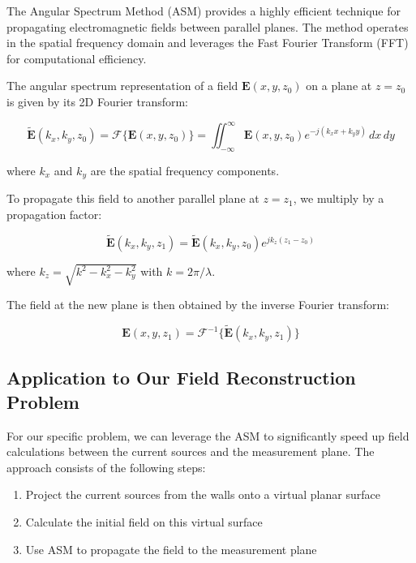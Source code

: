 \documentclass[12pt,a4paper]{article}
\begin{document}
The Angular Spectrum Method (ASM) provides a highly efficient technique for propagating electromagnetic fields between parallel planes. The method operates in the spatial frequency domain and leverages the Fast Fourier Transform (FFT) for computational efficiency.

The angular spectrum representation of a field $\mathbf{E}(x,y,z_0)$ on a plane at $z = z_0$ is given by its 2D Fourier transform:

\begin{equation}
    \tilde{\mathbf{E}}(k_x, k_y, z_0) = \mathcal{F}\{\mathbf{E}(x,y,z_0)\} = \iint_{-\infty}^{\infty} \mathbf{E}(x,y,z_0) e^{-j(k_x x + k_y y)} \, dx \, dy
\end{equation}

where $k_x$ and $k_y$ are the spatial frequency components.

To propagate this field to another parallel plane at $z = z_1$, we multiply by a propagation factor:

\begin{equation}
    \tilde{\mathbf{E}}(k_x, k_y, z_1) = \tilde{\mathbf{E}}(k_x, k_y, z_0) e^{jk_z(z_1-z_0)}
\end{equation}

where $k_z = \sqrt{k^2 - k_x^2 - k_y^2}$ with $k = 2\pi/\lambda$.

The field at the new plane is then obtained by the inverse Fourier transform:

\begin{equation}
    \mathbf{E}(x,y,z_1) = \mathcal{F}^{-1}\{\tilde{\mathbf{E}}(k_x, k_y, z_1)\}
\end{equation}

\subsection{Application to Our Field Reconstruction Problem}

For our specific problem, we can leverage the ASM to significantly speed up field calculations between the current sources and the measurement plane. The approach consists of the following steps:

\begin{enumerate}
    \item Project the current sources from the walls onto a virtual planar surface
    \item Calculate the initial field on this virtual surface
    \item Use ASM to propagate the field to the measurement plane
\end{enumerate}
\end{document}
